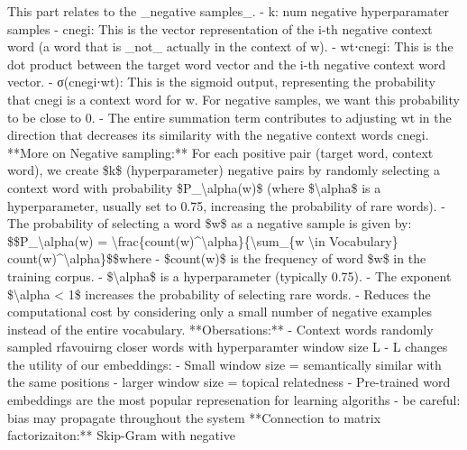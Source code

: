 \documentclass[
]{article}
\begin{document}
This part relates to the \_negative samples\_. - k: num negative
hyperparamater samples - cnegi\hspace{0pt}\hspace{0pt}: This is the
vector representation of the i-th negative context word (a word that is
\_not\_ actually in the context of w). -
wt⋅cnegi\hspace{0pt}\hspace{0pt}: This is the dot product between the
target word vector and the i-th negative context word vector. -
σ(cnegi\hspace{0pt}\hspace{0pt}⋅wt): This is the sigmoid output,
representing the probability that cnegi\hspace{0pt}\hspace{0pt} is a
context word for w. For negative samples, we want this probability to be
close to 0. - The entire summation term contributes to adjusting wt in
the direction that decreases its similarity with the negative context
words cnegi\hspace{0pt}\hspace{0pt}. **More on Negative sampling:** For
each positive pair (target word, context word), we create \$k\$
(hyperparameter) negative pairs by randomly selecting a context word
with probability \$P\_\textbackslash alpha(w)\$ (where
\$\textbackslash alpha\$ is a hyperparameter, usually set to 0.75,
increasing the probability of rare words). - The probability of
selecting a word \$w\$ as a negative sample is given by:
\$\$P\_\textbackslash alpha(w) =
\textbackslash frac\{count(w)\^{}\textbackslash alpha\}\{\textbackslash sum\_\{w\textquotesingle{}
\textbackslash in Vocabulary\}
count(w\textquotesingle)\^{}\textbackslash alpha\}\$\$where -
\$count(w)\$ is the frequency of word \$w\$ in the training corpus. -
\$\textbackslash alpha\$ is a hyperparameter (typically 0.75). - The
exponent \$\textbackslash alpha \textless{} 1\$ increases the
probability of selecting rare words. - Reduces the computational cost by
considering only a small number of negative examples instead of the
entire vocabulary. **Obersations:** - Context words randomly sampled
rfavouirng closer words with hyperparamter window size L - L changes the
utility of our embeddings: - Small window size = semantically similar
with the same positions - larger window size = topical relatedness -
Pre-trained word embeddings are the most popular represenation for
learning algoriths - be careful: bias may propagate throughout the
system **Connection to matrix factorizaiton:** Skip-Gram with negative
\end{document}

